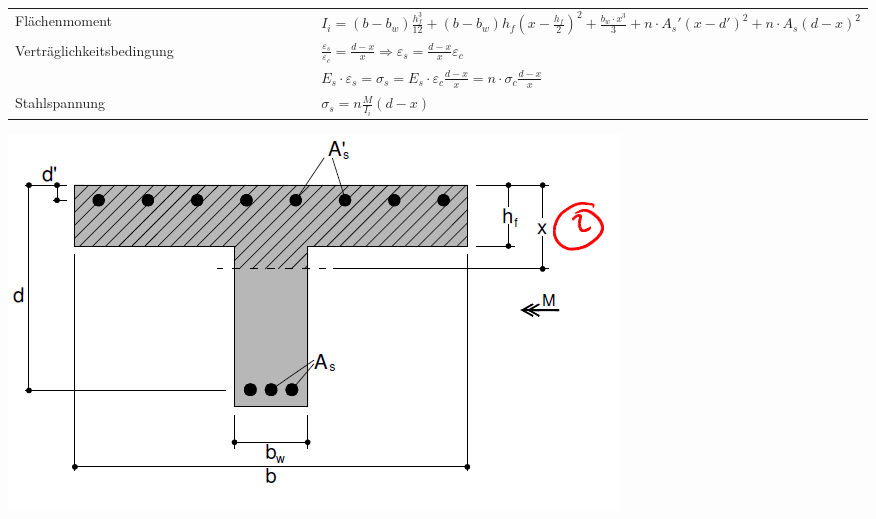 \begin{landscape}
\begin{multicols}{3}
\begin{tabular}{p{0.4\linewidth}|p{0.6\linewidth}}
		Flächenmoment		& $ I_{i} = (b - b_w) \frac{h_f^3}{12} + (b - b_w) h_f \left( x - \frac{h_f}{2} \right)^2 + \frac{b_w \cdot x^3}{3} + n \cdot A_s' (x - d')^2 + n \cdot A_s (d - x)^2 $	  \\
		
		\hspace*{0pt} Verträglichkeitsbedingung & $ \frac{\varepsilon_s}{\varepsilon_c} = \frac{d - x}{x}
		\Rightarrow \varepsilon_s = \frac{d - x}{x} \varepsilon_c $	 \\
		& $ E_s \cdot \varepsilon_s = \sigma_s = E_s \cdot \varepsilon_c \frac{d - x}{x} = n \cdot \sigma_c \frac{d - x}{x} $		\\
		
		Stahlspannung			& $ \sigma_s = n \frac{M}{I_i} (d - x) $ \\
		
	\end{tabular}


	\includegraphics[width=0.5\linewidth]{images/Risse4Plattenbalken.PNG}

	
\end{multicols}

\end{landscape}